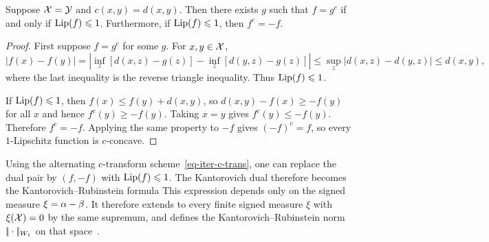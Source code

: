 \begin{prop}\label{prop-w1-c-transform-lipschitz}
	Suppose $\mathcal{X}=\mathcal{Y}$ and $c(x,y)=d(x,y)$. Then there exists $g$ such that $f=g^c$ if and only if $\operatorname{Lip}(f)\leqslant1$. Furthermore, if $\operatorname{Lip}(f)\leqslant1$, then $f^c=-f$.
\end{prop}
\begin{proof}
	First suppose $f=g^c$ for some $g$. For $x,y\in\mathcal{X}$,
	\[
		|f(x)-f(y)|
		=
		\left|\inf_z[d(x,z)-g(z)]-\inf_z[d(y,z)-g(z)]\right|
		\leq
		\sup_z |d(x,z)-d(y,z)|
		\leq d(x,y),
	\]
	where the last inequality is the reverse triangle inequality. Thus $\operatorname{Lip}(f)\leqslant1$.

	If $\operatorname{Lip}(f)\leqslant1$, then $f(x)\leq f(y)+d(x,y)$, so $d(x,y)-f(x)\geq -f(y)$ for all $x$ and hence $f^c(y)\geq -f(y)$. Taking $x=y$ gives $f^c(y)\leq -f(y)$. Therefore $f^c=-f$. Applying the same property to $-f$ gives $(-f)^c=f$, so every $1$-Lipschitz function is $c$-concave.
\end{proof}

Using the alternating $c$-transform scheme~\eqref{eq-iter-c-trans}, one can replace the dual pair by $(f,-f)$ with $\operatorname{Lip}(f)\leqslant1$. The Kantorovich dual therefore becomes the Kantorovich--Rubinstein formula
This expression depends only on the signed measure $\xi=\alpha-\beta$. It therefore extends to every finite signed measure $\xi$ with $\xi(\mathcal{X})=0$ by the same supremum, and defines the Kantorovich--Rubinstein norm $|\!| \cdot |\!|_{W_1}$ on that space~\cite{kantorovich1958space}.

